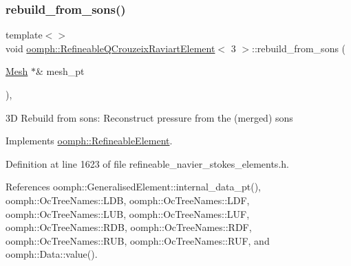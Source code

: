 \subsubsection{\texorpdfstring{rebuild\+\_\+from\+\_\+sons()}{rebuild\_from\_sons()}\hspace{0.1cm}{\footnotesize\ttfamily [3/3]}}
{\footnotesize\ttfamily template$<$$>$ \\
void \hyperlink{classoomph_1_1RefineableQCrouzeixRaviartElement}{oomph\+::\+Refineable\+Q\+Crouzeix\+Raviart\+Element}$<$ 3 $>$\+::rebuild\+\_\+from\+\_\+sons (\begin{DoxyParamCaption}\item[{\hyperlink{classoomph_1_1Mesh}{Mesh} $\ast$\&}]{mesh\+\_\+pt }\end{DoxyParamCaption})\hspace{0.3cm}{\ttfamily [inline]}, {\ttfamily [virtual]}}



3D Rebuild from sons\+: Reconstruct pressure from the (merged) sons 



Implements \hyperlink{classoomph_1_1RefineableElement_a33324be27833fa4b78279d17158215fa}{oomph\+::\+Refineable\+Element}.



Definition at line 1623 of file refineable\+\_\+navier\+\_\+stokes\+\_\+elements.\+h.



References oomph\+::\+Generalised\+Element\+::internal\+\_\+data\+\_\+pt(), oomph\+::\+Oc\+Tree\+Names\+::\+L\+DB, oomph\+::\+Oc\+Tree\+Names\+::\+L\+DF, oomph\+::\+Oc\+Tree\+Names\+::\+L\+UB, oomph\+::\+Oc\+Tree\+Names\+::\+L\+UF, oomph\+::\+Oc\+Tree\+Names\+::\+R\+DB, oomph\+::\+Oc\+Tree\+Names\+::\+R\+DF, oomph\+::\+Oc\+Tree\+Names\+::\+R\+UB, oomph\+::\+Oc\+Tree\+Names\+::\+R\+UF, and oomph\+::\+Data\+::value().

\mbox{\label{classoomph_1_1RefineableQCrouzeixRaviartElement_a4aa807058435a5efc4b1c28cefc4d080}} 
